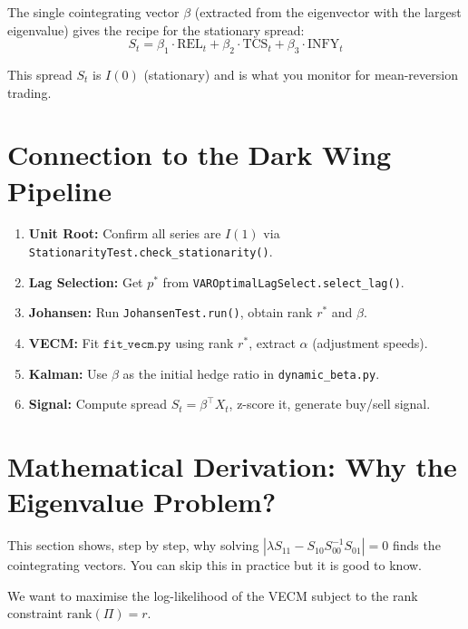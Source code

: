 \documentclass[12pt, a4paper]{article}
\begin{document}
The single cointegrating vector $\beta$ (extracted from the eigenvector with the largest eigenvalue) 
gives the recipe for the stationary spread:
\[
S_t = \beta_1 \cdot \text{REL}_t + \beta_2 \cdot \text{TCS}_t + \beta_3 \cdot \text{INFY}_t
\]

This spread $S_t$ is $I(0)$ (stationary) and is what you monitor for mean-reversion trading.

\section{Connection to the Dark Wing Pipeline}

\begin{enumerate}[label=\textbf{Step \arabic*:}]
    \item \textbf{Unit Root:} Confirm all series are $I(1)$ via \texttt{StationarityTest.check\_stationarity()}.
    \item \textbf{Lag Selection:} Get $p^*$ from \texttt{VAROptimalLagSelect.select\_lag()}.
    \item \textbf{Johansen:} Run \texttt{JohansenTest.run()}, obtain rank $r^*$ and $\beta$.
    \item \textbf{VECM:} Fit $\texttt{fit\_vecm.py}$ using rank $r^*$, extract $\alpha$ (adjustment speeds).
    \item \textbf{Kalman:} Use $\beta$ as the initial hedge ratio in \texttt{dynamic\_beta.py}.
    \item \textbf{Signal:} Compute spread $S_t = \beta^\top X_t$, z-score it, generate buy/sell signal.
\end{enumerate}

\newpage
\section{Mathematical Derivation: Why the Eigenvalue Problem?}

This section shows, step by step, why solving $|\lambda S_{11} - S_{10} S_{00}^{-1} S_{01}| = 0$ 
finds the cointegrating vectors. You can skip this in practice but it is good to know.

\medskip
We want to maximise the log-likelihood of the VECM subject to the rank constraint $\text{rank}(\Pi) = r$.
\end{document}
